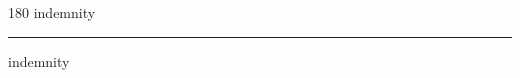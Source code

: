 
\begin{frame}
\begin{center}
\begin{turn}{180}
{\fontsize{2.5cm}{1em}\selectfont indemnity}
\end{turn}
\vspace{1em}\par  
\hrule
\vspace{1em}\par  
{\fontsize{2.5cm}{1em}\selectfont indemnity}
\end{center}
\end{frame}
